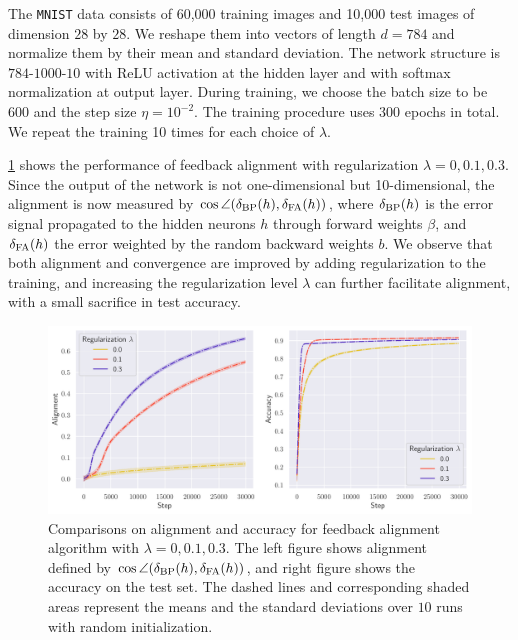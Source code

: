 The \texttt{MNIST} data consists of 60,000 training images and 10,000 test images of dimension $28$ by $28$. We reshape them into vectors of length $d = 784$ and normalize them by their mean and standard deviation. The network structure is $784$-$1000$-$10$ with ReLU activation at the hidden layer and with softmax normalization at output layer. During training, we choose the batch size to be $600$ and the step size $\eta = 10^{-2}$. The training procedure uses $300$ epochs in total. We repeat the training 10 times for each choice of $\lambda$.

\cref{fig:mnist} shows the performance of feedback alignment with regularization $\lambda = 0, 0.1, 0.3$. Since the output of the network is not one-dimensional but 10-dimensional, the alignment is now measured by $\cos \angle(\delta_\mathrm{BP}(h),\delta_\mathrm{FA}(h))$, where $\delta_\mathrm{BP}(h)$ is the error signal propagated to the hidden neurons $h$ through forward weights $\beta$, and $\delta_\mathrm{FA}(h)$ the error weighted by the random backward weights $b$. We observe that both alignment and convergence are improved by adding regularization to the training, and increasing the regularization level $\lambda$ can further facilitate alignment, with a small sacrifice in test accuracy.

\begin{figure}[t]
  \centering
  \includegraphics[width=\textwidth]{figures/mnist_2l_v6_horizontal.pdf}
  \caption{Comparisons on alignment and accuracy for feedback alignment algorithm with $\lambda=0,0.1,0.3$. The left figure shows alignment defined by $\cos \angle(\delta_\mathrm{BP}(h),\delta_\mathrm{FA}(h))$, and right figure shows the accuracy on the test set. The dashed lines and corresponding shaded areas represent the means and the standard deviations over $10$ runs with random initialization.}
  \label{fig:mnist}
\end{figure}
